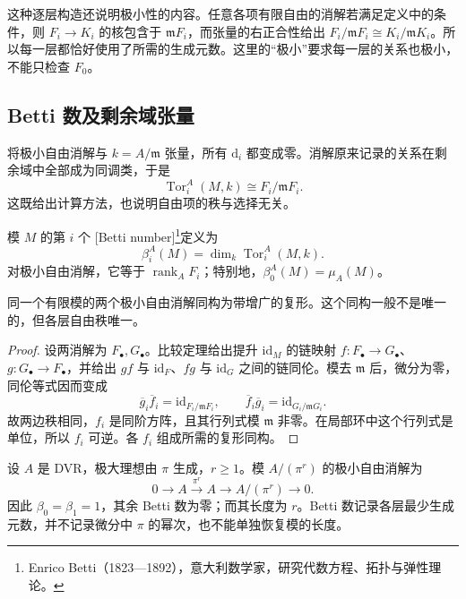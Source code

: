 这种逐层构造还说明极小性的内容。任意各项有限自由的消解若满足定义中的条件，则 \(F_i\to K_i\) 的核包含于 \(\mathfrak mF_i\)，而张量的右正合性给出
\(F_i/\mathfrak mF_i\cong K_i/\mathfrak mK_i\)。所以每一层都恰好使用了所需的生成元数。这里的“极小”要求每一层的关系也极小，不能只检查 \(F_0\)。

\subsection{Betti 数及剩余域张量}
\label{g5:subsec:0804:02}

将极小自由消解与 \(k=A/\mathfrak m\) 张量，所有 \(\mathrm d_i\) 都变成零。消解原来记录的关系在剩余域中全部成为同调类，于是
\[
	\operatorname{Tor}_i^A(M,k)\cong F_i/\mathfrak mF_i.
\]
这既给出计算方法，也说明自由项的秩与选择无关。

\begin{definition}\label{g5:def:betti-number}
	模 \(M\) 的第 \(i\) 个 [Betti number]\footnote{Enrico Betti（1823—1892），意大利数学家，研究代数方程、拓扑与弹性理论。}定义为
	\[
		\beta_i^A(M)=\dim_k\operatorname{Tor}_i^A(M,k).
	\]
	对极小自由消解，它等于 \(\operatorname{rank}_A F_i\)；特别地，\(\beta_0^A(M)=\mu_A(M)\)。
\end{definition}

\begin{proposition}\label{g5:prop:minimal-resolution-uniqueness}
	同一个有限模的两个极小自由消解同构为带增广的复形。这个同构一般不是唯一的，但各层自由秩唯一。
\end{proposition}
\begin{proof}
	设两消解为 \(F_\bullet,G_\bullet\)。比较定理给出提升 \(\mathrm{id}_M\) 的链映射 \(f:F_\bullet\to G_\bullet\)、\(g:G_\bullet\to F_\bullet\)，并给出 \(gf\) 与 \(\mathrm{id}_F\)、\(fg\) 与 \(\mathrm{id}_G\) 之间的链同伦。模去 \(\mathfrak m\) 后，微分为零，同伦等式因而变成
	\[
		\overline g_i\overline f_i=\mathrm{id}_{F_i/\mathfrak mF_i},
		\qquad
		\overline f_i\overline g_i=\mathrm{id}_{G_i/\mathfrak mG_i}.
	\]
	故两边秩相同，\(f_i\) 是同阶方阵，且其行列式模 \(\mathfrak m\) 非零。在局部环中这个行列式是单位，所以 \(f_i\) 可逆。各 \(f_i\) 组成所需的复形同构。
\end{proof}

\begin{example}\label{g5:exm:dvr-betti}
	设 \(A\) 是 DVR，极大理想由 \(\pi\) 生成，\(r\geq1\)。模 \(A/(\pi^r)\) 的极小自由消解为
	\[
		0\longrightarrow A\xrightarrow{\ \pi^r\ }A
		\longrightarrow A/(\pi^r)\longrightarrow0.
	\]
	因此 \(\beta_0=\beta_1=1\)，其余 Betti 数为零；而其长度为 \(r\)。Betti 数记录各层最少生成元数，并不记录微分中 \(\pi\) 的幂次，也不能单独恢复模的长度。
\end{example}


